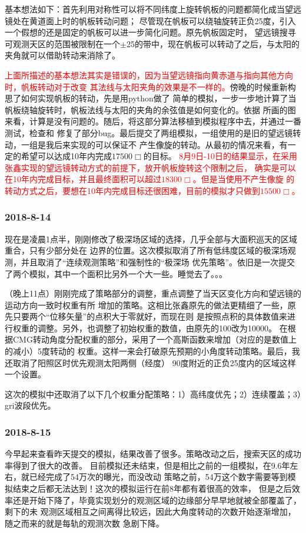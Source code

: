 \documentclass[a4paper,11pt]{ctexart}
\newcommand{\RT}[1]{\textcolor{red}{#1}}
\begin{document}
基本想法如下：首先利用对称性可以将不同纬度上旋转帆板的问题都简化成当望远镜处在黄道面上时的帆板转动问题；
尽管现在帆板可以绕轴旋转正负25度，引入一个假想的还是固定的帆板可以进一步简化问题。原先帆板固定时，
望远镜搜寻可观测天区的范围被限制在一个$\pm$25\textdegree 的带中，现在帆板可以转动了之后，与太阳的
夹角就可以借助转动来消除了。

\RT{上面所描述的基本想法其实是错误的，因为当望远镜指向黄赤道与指向其他方向时，帆板转动对于改变
其法线与太阳夹角的效果是不一样的。}傍晚的时候重新构思了如何实现帆板的转动，先是用python做了
简单的模拟，一步一步地计算了当帆板绕轴旋转时，帆板法线与太阳的夹角的余弦值是如何变化的。依据
所画的图来看，计算是没有问题的。随后，将这部分算法移植到模拟程序中去，并通过一番测试，检查和
修复了部分bug。最后提交了两组模拟，一组使用的是旧的望远镜转动，一组是我后来实现的可以保证不
产生像旋的转动。从最初的情况来看，有一定的希望可以达成10年内完成$17500\Box$\textdegree 的目标。
\RT{8月9日-10日的结果显示，在采用张鑫实现的望远镜转动方式的前提下，放开帆板旋转这个限制之后，
确实是可以在10年内完成目标，并且最终面积可以超过$18300\Box$\textdegree。但是当使用不产生像旋
的转动方式之后，要想在10年内完成目标还很困难，目前的模拟才只做到$15500\Box$\textdegree。}

\subsubsection{2018-8-14}
现在是凌晨1点半，刚刚修改了极深场区域的选择，几乎全部与大面积巡天的区域重合，只有少部分处在
边界的位置。这次模拟取消了所有低纬度区域的极深场观测，并且取消了“连续观测策略”和强制性的“极深场
优先策略”。依旧是一次提交了两个模拟，其中一个面积比另外一个大一些。睡觉去了。。。

（晚上11点）刚刚完成了策略部分的调整，重点调整了当天区变化方向和望远镜的运动方向一致时权重有所
增加的策略。这相比张鑫原先的做法更精细了一些，原先只要两个“位移矢量”的点积大于零就好，而现在则
是按照点积的具体数值来进行权重的调整。另外，也调整了初始权重的数值，由原先的100改为10000。
在根据CMG转动角度分配权重的部分，采用了一个高斯函数来增加（对应的是数值上的减小）5度转动的
权重。这样一来会打破原先预期的小角度转动策略。最后，我还取消了阳照区时优先观测太阳两侧（经度）
90度附近的正负25度内的区域这样一个设置。

这次的模拟中还取消了以下几个权重分配策略：1）高纬度优先；2）连续覆盖；3）gri波段优先。

\subsubsection{2018-8-15}
今早起来查看昨天提交的模拟，结果改善了很多。策略改动之后，搜索天区的成功率得到了很大的改善。
目前模拟还未结束，但是相比之前的一组模拟，在9.6年左右，就已经完成了54万次的曝光，而没改动
策略之前，54万这个数字需要等到模拟结束之后都无法达到！这次的模拟运行在前8年都有着很高的效率，
但是之后效率还是开始下降了，毕竟实现划分的观测区域的边缘部分早早地就被全部覆盖了，剩下的未
观测区域相互之间离得比较远，因此大角度转动的次数开始逐渐增加，随之而来的就是每轨的观测次数
急剧下降。
\end{document}
